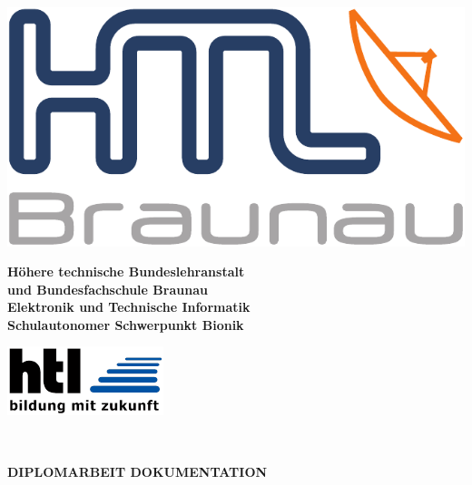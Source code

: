 
\pagebreak
\thispagestyle{empty}

\begin{minipage}[c]{0.20\linewidth}
\includegraphics[width=0.8\linewidth]{media/images/htl_c_cmyk_rein}
\end{minipage}
\begin{minipage}[c]{0.6\linewidth}
\begin{center}
{\bfseries\sffamily\large Höhere  technische  Bundeslehranstalt\\
und  Bundesfachschule  Braunau\\
Elektronik und Technische Informatik\\
{\normalsize Schulautonomer Schwerpunkt Bionik} }
\end{center}
\end{minipage}
\begin{minipage}[c]{0.2\linewidth}
\hfill \includegraphics[width=0.8\linewidth]{media/images/htl-bildung-mit-zukunft}
\end{minipage}\\

\vspace{1em}
\begin{center}
\bfseries\sffamily\Large
DIPLOMARBEIT DOKUMENTATION
\end{center}
\vspace{1ex}

